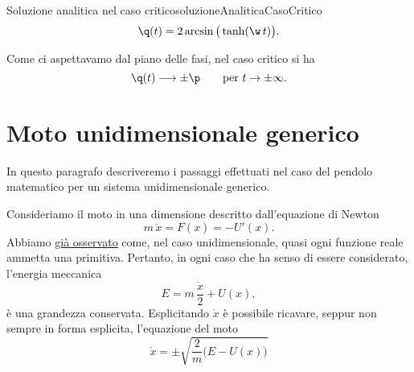 \begin{remark}{Soluzione analitica nel caso critico}{soluzioneAnaliticaCasoCritico}
	\[
		\q(t) = 2\arcsin\big(\tanh(\w\,t)\big).
	\]
\end{remark}

\begin{oss}
	Come ci aspettavamo dal piano delle fasi, nel caso critico si ha
	\[
		\q(t) \longrightarrow \pm \p \qquad\text{per }t \to \pm \infty.
	\]
\end{oss}
%
%
\section{Moto unidimensionale generico}

In questo paragrafo descriveremo i passaggi effettuati nel caso del pendolo matematico per un sistema unidimensionale generico.

Consideriamo il moto in una dimensione descritto dall'equazione di Newton
\[
	m\,\ddot{x} = F(x) = -U'(x).
\]
Abbiamo \hyperref[oss:conservazioneUnidim]{già osservato} come, nel caso unidimensionale, quasi ogni funzione reale ammetta una primitiva.
Pertanto, in ogni caso che ha senso di essere considerato, l'energia meccanica
\[
	E = m\,\frac{\dot{x}}{2} + U(x),
\]
è una grandezza conservata.
Esplicitando \(\dot{x}\) è possibile ricavare, seppur non sempre in forma esplicita, l'equazione del moto
\[
	\dot{x} = \pm \sqrt{\frac{2}{m}\big(E-U(x)\big)}
\]

